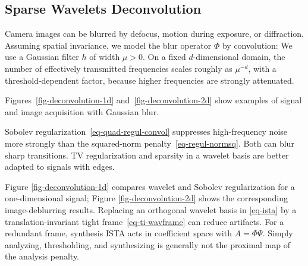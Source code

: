                                                                 
\subsection{Sparse Wavelets Deconvolution}


Camera images can be blurred by defocus, motion during exposure, or diffraction. Assuming spatial invariance, we model the blur operator $\Phi$ by convolution:
We use a Gaussian filter $h$ of width $\mu > 0$. On a fixed $d$-dimensional domain, the number of effectively transmitted frequencies scales roughly as $\mu^{-d}$, with a threshold-dependent factor, because higher frequencies are strongly attenuated.

Figures~\ref{fig-deconvolution-1d} and~\ref{fig-deconvolution-2d} show examples of signal and image acquisition with Gaussian blur.

Sobolev regularization~\eqref{eq-quad-regul-convol} suppresses high-frequency noise more strongly than the squared-norm penalty~\eqref{eq-regul-normsq}. Both can blur sharp transitions. TV regularization and sparsity in a wavelet basis are better adapted to signals with edges.

Figure \ref{fig-deconvolution-1d} compares wavelet and Sobolev regularization for a one-dimensional signal; Figure \ref{fig-deconvolution-2d} shows the corresponding image-deblurring results. Replacing an orthogonal wavelet basis in \eqref{eq-ista} by a translation-invariant tight frame~\eqref{eq-ti-wavframe} can reduce artifacts. For a redundant frame, synthesis ISTA acts in coefficient space with $A=\Phi\Psi$. Simply analyzing, thresholding, and synthesizing is generally not the proximal map of the analysis penalty.


                                  

  



